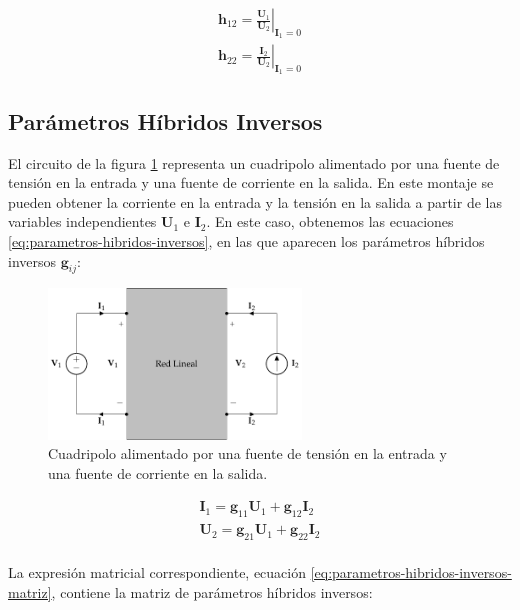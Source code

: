\[
  \begin{array}{c}
    \mathbf{h}_{12} = \left.\frac{\mathbf{U}_1}{\mathbf{U}_2}\right\rvert_{\mathbf{I}_1 = 0}\\
    \mathbf{h}_{22} = \left.\frac{\mathbf{I}_2}{\mathbf{U}_2}\right\rvert_{\mathbf{I}_1 = 0}
  \end{array}
\]


\subsection{Parámetros Híbridos Inversos}

El circuito de la figura \ref{fig:cuadripolo-hibridos-inversos}
representa un cuadripolo alimentado por una fuente de tensión en la
entrada y una fuente de corriente en la salida. En este montaje se
pueden obtener la corriente en la entrada y la tensión en la salida a
partir de las variables independientes \(\mathbf{U}_1\) e
\(\mathbf{I}_2\). En este caso, obtenemos las ecuaciones
\ref{eq:parametros-hibridos-inversos}, en las que aparecen los
parámetros híbridos inversos $\mathbf{g}_{ij}$:

\begin{figure}[H]
  \centering
  \includegraphics[height=4cm]{../figs/cuadripolo_hibrido_inverso.pdf}
  \caption{Cuadripolo alimentado por una fuente de tensión en la
    entrada y una fuente de corriente en la salida.}
  \label{fig:cuadripolo-hibridos-inversos}
\end{figure}

\begin{equation}
  \label{eq:parametros-hibridos-inversos}
    \begin{array}{l}
      \mathbf{I}_1 = \mathbf{g}_{11} \mathbf{U}_1 + \mathbf{g}_{12} \mathbf{I}_2\\
      \mathbf{U}_2 = \mathbf{g}_{21} \mathbf{U}_1 + \mathbf{g}_{22} \mathbf{I}_2\\
    \end{array}
\end{equation}

La expresión matricial correspondiente, ecuación
\ref{eq:parametros-hibridos-inversos-matriz}, contiene la matriz de
parámetros híbridos inversos:

